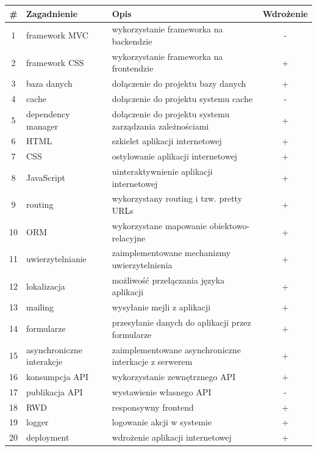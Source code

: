 \documentclass[a4paper,12pt]{report}
\begin{document}
\begin{table}[H]
\centering
\begin{tabular}{|c|m{4cm}|m{7cm}|c|}
\hline
\# & Zagadnienie & Opis & Wdrożenie \\
\hline
1 & framework MVC & wykorzystanie frameworka na backendzie & - \\
\hline
2 & framework CSS & wykorzystanie frameworka na frontendzie & + \\
\hline
3 & baza danych & dołączenie do projektu bazy danych & + \\
\hline
4 & cache & dołączenie do projektu systemu cache & - \\
\hline
5 & dependency manager & dołączenie do projektu systemu zarządzania zależnościami & + \\
\hline
6 & HTML & szkielet aplikacji internetowej & + \\
\hline
7 & CSS & ostylowanie aplikacji internetowej & + \\
\hline
8 & JavaScript & uinteraktywnienie aplikacji internetowej & + \\
\hline
9 & routing & wykorzystany routing i tzw. pretty URLs & + \\
\hline
10 & ORM & wykorzystane mapowanie obiektowo-relacyjne & + \\
\hline
11 & uwierzytelnianie & zaimplementowane mechanizmy uwierzytelnienia & + \\
\hline
12 & lokalizacja & możliwość przełączania języka aplikacji & + \\
\hline
13 & mailing & wysyłanie mejli z aplikacji & + \\
\hline
14 & formularze & przesyłanie danych do aplikacji przez formularze & + \\
\hline
15 & asynchroniczne interakcje & zaimplementowane asynchroniczne interkacje z serwerem & + \\
\hline
16 & konsumpcja API & wykorzystanie zewnętrznego API & + \\
\hline
17 & publikacja API & wystawienie własnego API & - \\
\hline
18 & RWD & responsywny frontend & + \\
\hline
19 & logger & logowanie akcji w systemie & + \\
\hline
20 & deployment & wdrożenie aplikacji internetowej & + \\
\hline
\end{tabular}
\label{tab:zagadnienia}
\end{table}
\end{document}
